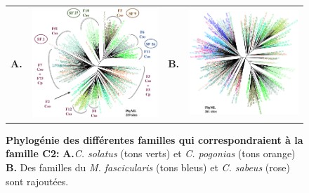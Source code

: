 \documentclass[12pt,a4paper]{article}
\begin{document}
			\begin{figure}
			\center	
			\begin{tabular}{cccc}
		\textbf{A.} & \includegraphics[scale=0.30]{img/tree_C2_pogonias_solatus.png} & \textbf{B.} & \includegraphics[scale=0.30]{img/tree_C2_all_species.png} \\
	\end{tabular}
	\caption{\textbf{Phylogénie des différentes familles qui correspondraient à la famille C2:}
	\textbf{A.}\textit{C. solatus} (tons verts) et \textit{C. pogonias} (tons orange) \textbf{B.} Des familles du \textit{M. fascicularis} (tons bleus) et \textit{C. sabeus} (rose) sont rajoutées.	 
	\label{tree_C2}} 
\end{figure}
\end{document}
